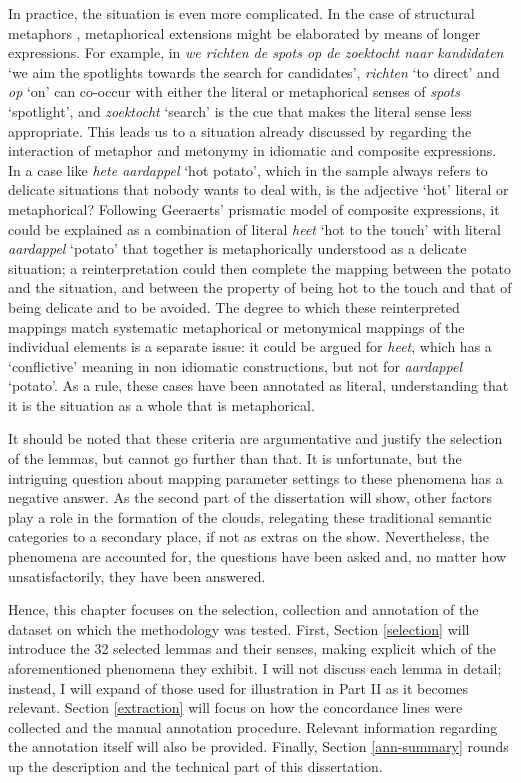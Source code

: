 \documentclass[
]{book}
\begin{document}
In practice, the situation is even more complicated. In the case of structural metaphors
\autocite{lakoff.johnson_2003},
metaphorical extensions might be elaborated by means of longer expressions. For example, in \emph{we richten de spots op de zoektocht naar kandidaten} `we aim the spotlights towards the search for candidates', \emph{richten} `to direct' and \emph{op} `on' can co-occur with either the literal or metaphorical senses of \emph{spots} `spotlight', and \emph{zoektocht} `search' is the cue that makes the literal sense less appropriate. This leads us to a situation already discussed by
\textcite{geeraerts_2003}
regarding the interaction of metaphor and metonymy in idiomatic and composite expressions. In a case like \emph{hete aardappel} `hot potato', which in the sample always refers to delicate situations that nobody wants to deal with, is the adjective `hot' literal or metaphorical? Following Geeraerts' prismatic model of composite expressions,
it could be explained as a combination of literal \emph{heet} `hot to the touch' with literal \emph{aardappel} `potato' that together is metaphorically understood as a delicate situation; a reinterpretation could then complete the mapping between the potato and the situation, and between the property of being hot to the touch and that of being delicate and to be avoided. The degree to which these reinterpreted mappings match systematic metaphorical or metonymical mappings of the individual elements is a separate issue: it could be argued for \emph{heet}, which has a `conflictive' meaning in non idiomatic constructions, but not for \emph{aardappel} `potato'. As a rule, these cases have been annotated as literal, understanding that it is the situation as a whole that is metaphorical.

It should be noted that these criteria are argumentative and justify the selection of the lemmas, but cannot go further than that. It is unfortunate, but the intriguing question about mapping parameter settings to these phenomena has a negative answer. As the second part of the dissertation will show, other factors play a role in the formation of the clouds, relegating these traditional semantic categories to a secondary place, if not as extras on the show. Nevertheless, the phenomena are accounted for, the questions have been asked and, no matter how unsatisfactorily, they have been answered.

Hence, this chapter focuses on the selection, collection and annotation of the dataset on which the methodology was tested. First, Section \ref{selection} will introduce the 32 selected lemmas and their senses, making explicit which of the aforementioned phenomena they exhibit. I will not discuss each lemma in detail; instead, I will expand of those used for illustration in Part II as it becomes relevant. Section \ref{extraction} will focus on how the concordance lines were collected and the manual annotation procedure. Relevant information regarding the annotation itself will also be provided. Finally, Section \ref{ann-summary} rounds up the description and the technical part of this dissertation.
\end{document}

